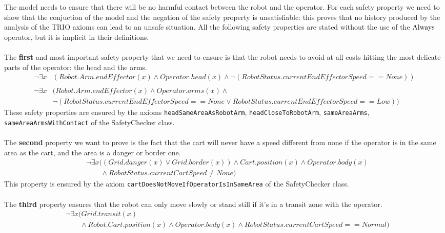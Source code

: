The model needs to ensure that there will be no harmful contact between the robot and the operator. For each safety property we need to show that the conjuction of the model and the negation of the safety property is unsatisfiable: this proves that no history produced by the analysis of the TRIO axioms can lead to an unsafe situation. All the following safety properties are stated without the use of the $\operatorname{Always}$ operator, but it is implicit in their definitions.
\\ \\
The \textbf{first} and most important safety property that we need to ensure is that the robot needs to avoid at all costs hitting the most delicate parts of the operator: the head and the arms.
\begin{align*}
\neg \exists x &(Robot.Arm.endEffector(x) \land Operator.head(x) \land \neg (RobotStatus.currentEndEffectorSpeed == None)) \\ \\
\neg \exists x &(Robot.Arm.endEffector(x) \land Operator.arms(x) \land \\
&\neg (RobotStatus.currentEndEffectorSpeed == None \lor RobotStatus.currentEndEffectorSpeed == Low))
\end{align*}
These safety properties are ensured by the axioms \texttt{headSameAreaAsRobotArm}, \texttt{headCloseToRobotArm}, \texttt{sameAreaArms}, \texttt{sameAreaArmsWithContact} of the SafetyChecker class.
\\ \\
The \textbf{second} property we want to prove is the fact that the cart will never have a speed different from none if the operator is in the same area as the cart, and the area is a danger or border one.
\begin{align*}
  &\neg \exists x ((Grid.danger(x) \lor Grid.border(x)) \land Cart.position(x) \land Operator.body(x) \\
  &\qquad \land RobotStatus.currentCartSpeed \neq None)
\end{align*}
This property is ensured by the axiom \texttt{cartDoesNotMoveIfOperatorIsInSameArea} of the SafetyChecker class.
\\ \\
The \textbf{third} property ensures that the robot can only move slowly or stand still if it's in a transit zone with the operator.
\begin{align*}
  &\neg \exists x (Grid.transit(x) \\
  &\qquad \land Robot.Cart.position(x) \land Operator.body(x) \land RobotStatus.currentCartSpeed == Normal)
\end{align*}
